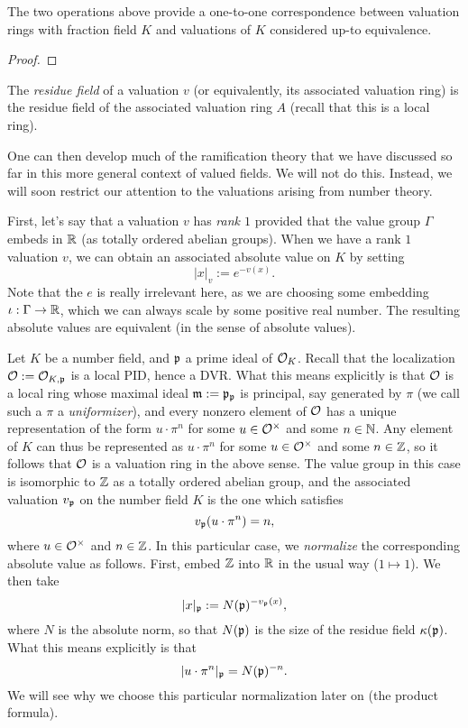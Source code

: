 \begin{lemma}
  The two operations above provide a one-to-one correspondence between valuation rings with fraction field $K$ and valuations of $K$ considered up-to equivalence.
\end{lemma}
\begin{proof}
\end{proof}

The \emph{residue field} of a valuation $v$ (or equivalently, its associated valuation ring) is the residue field of the associated valuation ring $A$ (recall that this is a local ring).

One can then develop much of the ramification theory that we have discussed so far in this more general context of valued fields.
We will not do this.
Instead, we will soon restrict our attention to the valuations arising from number theory.

First, let's say that a valuation $v$ has \emph{rank $1$} provided that the value group $\Gamma$ embeds in $\mathbb{R}$ (as totally ordered abelian groups).
When we have a rank $1$ valuation $v$, we can obtain an associated absolute value on $K$ by setting
\[ |x|_{v} := e^{-v(x)}. \]
Note that the $e$ is really irrelevant here, as we are choosing some embedding $\iota : \Gamma \to \mathbb{R}$, which we can always scale by some positive real number.
The resulting absolute values are equivalent (in the sense of absolute values).

Let $K$ be a number field, and $\mathfrak{p}$ a prime ideal of $\mathcal{O}_{K}$.
Recall that the localization $\mathcal{O} := \mathcal{O}_{K,\mathfrak{p}}$ is a local PID, hence a DVR.
What this means explicitly is that $\mathcal{O}$ is a local ring whose maximal ideal $\mathfrak{m} := \mathfrak{p}_{\mathfrak{p}}$ is principal, say generated by $\pi$ (we call such a $\pi$ a \emph{uniformizer}), and every nonzero element of $\mathcal{O}$ has a unique representation of the form $u \cdot \pi^{n}$ for some $u \in \mathcal{O}^{\times}$ and some $n \in \mathbb{N}$.
Any element of $K$ can thus be represented as $u \cdot \pi^{n}$ for some $u \in \mathcal{O}^{\times}$ and some $n \in \mathbb{Z}$, so it follows that $\mathcal{O}$ is a valuation ring in the above sense.
The value group in this case is isomorphic to $\mathbb{Z}$ as a totally ordered abelian group, and the associated valuation $v_{\mathfrak{p}}$ on the number field $K$ is the one which satisfies
\[ v_{\mathfrak{p}}(u \cdot \pi^{n}) = n, \]
where $u \in \mathcal{O}^{\times}$ and $n \in \mathbb{Z}$.
In this particular case, we \emph{normalize} the corresponding absolute value as follows.
First, embed $\mathbb{Z}$ into $\mathbb{R}$ in the usual way ($1 \mapsto 1$).
We then take
\[ |x|_{\mathfrak{p}} := N(\mathfrak{p})^{-v_{\mathfrak{p}}(x)}, \]
where $N$ is the absolute norm, so that $N(\mathfrak{p})$ is the size of the residue field $\kappa(\mathfrak{p})$.
What this means explicitly is that
\[ |u \cdot \pi^{n}|_{\mathfrak{p}} = N(\mathfrak{p})^{-n}. \]
We will see why we choose this particular normalization later on (the product formula).

